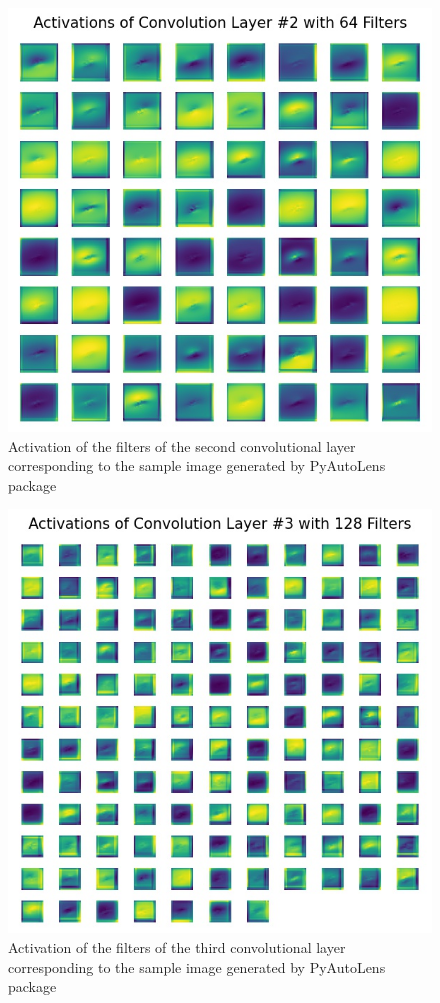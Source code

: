 \documentclass[12pt]{article}
\begin{document}
\begin{figure}[thb]
    \centering
    \includegraphics[width=\textwidth]{../figures/conv_activ2.jpg}
    \caption{Activation of the filters of the second convolutional layer corresponding to the sample image generated by PyAutoLens\cite{pyautolens} package}
    \label{fig:conv2}
\end{figure}

\begin{figure}[thb]
    \centering
    \includegraphics[width=\textwidth]{../figures/conv_activ3.jpg}
    \caption{Activation of the filters of the third convolutional layer corresponding to the sample image generated by PyAutoLens\cite{pyautolens} package}
    \label{fig:conv3}
\end{figure}

\clearpage

  
\end{document}
